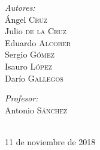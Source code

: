 \documentclass[12pt]{article}
\begin{document}
\begin{titlepage}

\begin{minipage}{0.4\textwidth}
\begin{flushleft} \large
\emph{Autores:}\\
Ángel \textsc{Cruz} \\ %
Julio \textsc{de la Cruz} \\
Eduardo \textsc{Alcober}\\
Sergio \textsc{Gómez}\\
Isauro \textsc{López}\\
Darío \textsc{Gallegos}
\end{flushleft}
\end{minipage}
\begin{minipage}{0.4\textwidth}
\begin{flushright} \large
\emph{Profesor:} \\
Antonio \textsc{Sánchez} %
\end{flushright}
\end{minipage}\\[0.66cm]
{\large 11 de noviembre de 2018}\\[0.5cm] %


\vfill %

\end{titlepage}



\tableofcontents %
\newpage

\end{document}
